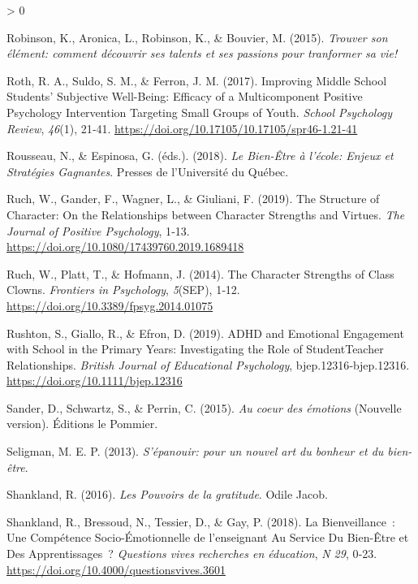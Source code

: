 \documentclass[
  french,
]{article}
\newlength{\cslhangindent}
\newenvironment{CSLReferences}[2] %
 {%
  \setlength{\parindent}{0pt}
  \ifodd #1 \everypar{\setlength{\hangindent}{\cslhangindent}}\ignorespaces\fi
  \ifnum #2 > 0
  \setlength{\parskip}{#2\baselineskip}
  \fi
 }%
 {}
\begin{document}
\begin{CSLReferences}{1}{0}
\leavevmode\hypertarget{ref-robinson2015}{}%
Robinson, K., Aronica, L., Robinson, K., \& Bouvier, M. (2015). \emph{{Trouver son élément: comment découvrir ses talents et ses passions pour tranformer sa vie!}}

\leavevmode\hypertarget{ref-roth2017}{}%
Roth, R. A., Suldo, S. M., \& Ferron, J. M. (2017). Improving {Middle School Students}' {Subjective Well}-{Being}: {Efficacy} of a {Multicomponent Positive Psychology Intervention Targeting Small Groups} of {Youth}. \emph{School Psychology Review}, \emph{46}(1), 21‑41. \url{https://doi.org/10.17105/10.17105/spr46-1.21-41}

\leavevmode\hypertarget{ref-rousseau2018}{}%
Rousseau, N., \& Espinosa, G. (éds.). (2018). \emph{Le Bien-Être à l'école: Enjeux et Stratégies Gagnantes}. {Presses de l'Université du Québec}.

\leavevmode\hypertarget{ref-ruch2019a}{}%
Ruch, W., Gander, F., Wagner, L., \& Giuliani, F. (2019). The Structure of Character: {On} the Relationships between Character Strengths and Virtues. \emph{The Journal of Positive Psychology}, 1‑13. \url{https://doi.org/10.1080/17439760.2019.1689418}

\leavevmode\hypertarget{ref-ruch2014}{}%
Ruch, W., Platt, T., \& Hofmann, J. (2014). The Character Strengths of Class Clowns. \emph{Frontiers in Psychology}, \emph{5}(SEP), 1‑12. \url{https://doi.org/10.3389/fpsyg.2014.01075}

\leavevmode\hypertarget{ref-rushton2019}{}%
Rushton, S., Giallo, R., \& Efron, D. (2019). {ADHD} and Emotional Engagement with School in the Primary Years: {Investigating} the Role of Student{}Teacher Relationships. \emph{British Journal of Educational Psychology}, bjep.12316‑bjep.12316. \url{https://doi.org/10.1111/bjep.12316}

\leavevmode\hypertarget{ref-sander2015}{}%
Sander, D., Schwartz, S., \& Perrin, C. (2015). \emph{{Au coeur des émotions}} (Nouvelle version). {Éditions le Pommier}.

\leavevmode\hypertarget{ref-seligman2013a}{}%
Seligman, M. E. P. (2013). \emph{{S'épanouir: pour un nouvel art du bonheur et du bien-être}}.

\leavevmode\hypertarget{ref-shankland2016a}{}%
Shankland, R. (2016). \emph{{Les Pouvoirs de la gratitude}}. {Odile Jacob}.

\leavevmode\hypertarget{ref-shankland2018a}{}%
Shankland, R., Bressoud, N., Tessier, D., \& Gay, P. (2018). La Bienveillance~: Une Compétence Socio-Émotionnelle de l'enseignant Au Service Du Bien-Être et Des Apprentissages~? \emph{Questions vives recherches en éducation}, \emph{N{} 29}, 0‑23. \url{https://doi.org/10.4000/questionsvives.3601}


\end{CSLReferences}
\end{document}
